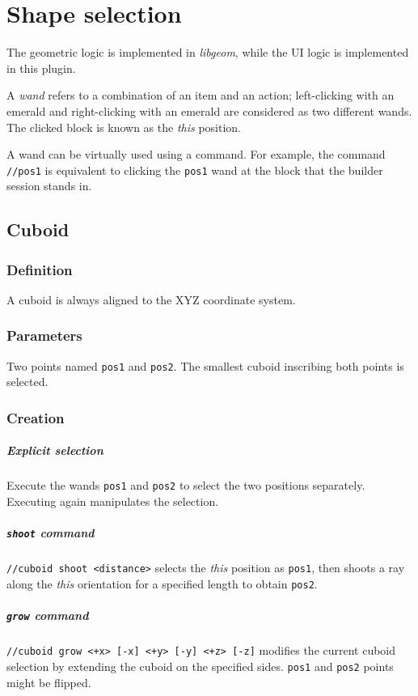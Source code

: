 \documentclass{report}
\begin{document}
		\chapter{Shape selection}
			\label{sec:shape-selection}
			The geometric logic is implemented in \textit{libgeom}, while the UI logic is implemented in this plugin.

			A \emph{wand} refers to a combination of an item and an action; left-clicking with an emerald and
			right-clicking with an emerald are considered as two different wands. The clicked block is known as the
			\textit{this} position.

			A wand can be virtually used using a command. For example, the command \texttt{//pos1} is equivalent to
			clicking the \texttt{pos1} wand at the block that the builder session stands in.

			\section{Cuboid}
				\subsection{Definition} A cuboid is always aligned to the XYZ coordinate system.
				\subsection{Parameters} Two points named \texttt{pos1} and \texttt{pos2}. The smallest cuboid
				inscribing both points is selected.
				\subsection{Creation}
					\paragraph{Explicit selection} Execute the wands \texttt{pos1} and \texttt{pos2} to select the two
					positions separately. Executing again manipulates the selection.
					\paragraph{\texttt{shoot} command} \texttt{//cuboid shoot <distance>} selects the \textit{this}
					position as \texttt{pos1}, then shoots a ray along the \textit{this} orientation for a specified
					length to obtain \texttt{pos2}.
					\paragraph{\texttt{grow} command} \texttt{//cuboid grow <+x> [-x] <+y> [-y] <+z> [-z]} modifies the
					current cuboid selection by extending the cuboid on the specified sides. \texttt{pos1} and
					\texttt{pos2} points might be flipped.
\end{document}

